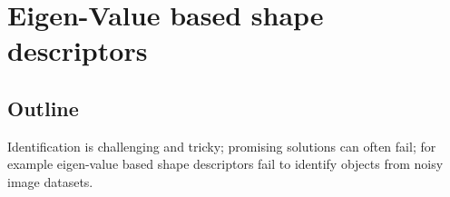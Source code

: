 \documentclass {udthesis}
\begin{document}

\chapter{Eigen-Value based shape descriptors}
\label{chap:eigen}

\section{Outline}
Identification is challenging and tricky; promising solutions can often fail; for example eigen-value based shape descriptors fail to identify objects from noisy image datasets.
\end{document}
